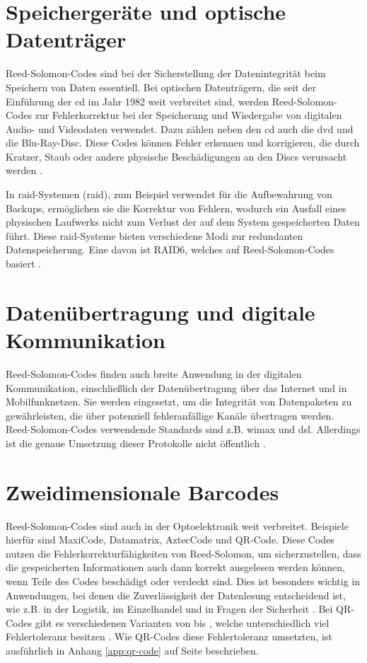 \section{Speichergeräte und optische Datenträger}

Reed-Solomon-Codes sind bei der Sicherstellung der Datenintegrität beim Speichern von Daten essentiell. 
Bei optischen Datenträgern, die seit der Einführung der \acrfull{cd} im Jahr 1982 weit verbreitet sind, werden Reed-Solomon-Codes zur Fehlerkorrektur bei der Speicherung und Wiedergabe von digitalen Audio- und Videodaten verwendet. Dazu zählen neben den \acrshort{cd} auch die \acrfull{dvd} und die Blu-Ray-Disc. 
Diese Codes können Fehler erkennen und korrigieren, die durch Kratzer, Staub oder andere physische Beschädigungen an den Discs verursacht werden \cite{changReedSolomonProductCodeRSPC1998}. 

In \acrshort{raid}-Systemen (\acrlong{raid}), zum Beispiel verwendet für die Aufbewahrung von Backups, ermöglichen sie die Korrektur von Fehlern, wodurch ein Ausfall eines physischen Laufwerks nicht zum Verlust der auf dem System gespeicherten Daten führt.
Diese \acrshort{raid}-Systeme bieten verschiedene Modi zur redundanten Datenspeicherung.
Eine davon ist RAID6, welches auf Reed-Solomon-Codes basiert \cite{RAIDStorageTechnology2021}.

\section{Datenübertragung und digitale Kommunikation}

Reed-Solomon-Codes finden auch breite Anwendung in der digitalen Kommunikation, einschließlich der Datenübertragung über das Internet und in Mobilfunknetzen. 
Sie werden eingesetzt, um die Integrität von Datenpaketen zu gewährleisten, die über potenziell fehleranfällige Kanäle übertragen werden. 
Reed-Solomon-Codes verwendende Standards sind z.B. \acrshort{wimax} und \acrshort{dsl}.
Allerdings ist die genaue Umsetzung dieser Protokolle nicht öffentlich \cite{vermillionEndtoEndDSLArchitectures}.

\section{Zweidimensionale Barcodes}

Reed-Solomon-Codes sind auch in der Optoelektronik weit verbreitet. Beispiele hierfür sind MaxiCode, Datamatrix, AztecCode und QR-Code. 
Diese Codes nutzen die Fehlerkorrekturfähigkeiten von Reed-Solomon, um sicherzustellen, dass die gespeicherten Informationen auch dann korrekt ausgelesen werden können, wenn Teile des Codes beschädigt oder verdeckt sind. 
Dies ist besonders wichtig in Anwendungen, bei denen die Zuverlässigkeit der Datenlesung entscheidend ist, wie z.B. in der Logistik, im Einzelhandel und in Fragen der Sicherheit \cite{tiwariIntroductionQRCode2016}.
Bei QR-Codes gibt es verschiedenen Varianten von  bis , welche unterschiedlich viel Fehlertoleranz besitzen \cite{QRCode2024}.
Wie QR-Codes diese Fehlertoleranz umsetzten, ist ausführlich in Anhang \ref{app:qr-code} auf Seite \pageref{app:qr-code} beschrieben.